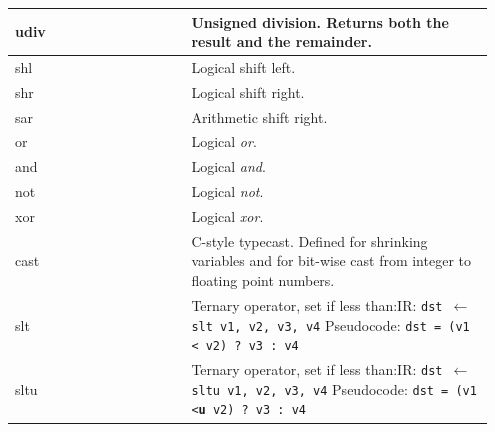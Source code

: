 \documentclass[course=eragp]{aspdoc}
\begin{document}
\begin{center}
\begin{longtable}{p{0.35\linewidth} | p{0.6\linewidth}}
        \hline
        udiv         & \textbf{Unsigned} division. Returns both the result and the remainder.                                                     \\
        \hline
        shl          & Logical shift left.                                                                                                        \\
        \hline
        shr          & Logical shift right.                                                                                                       \\
        \hline
        sar          & Arithmetic shift right.                                                                                                    \\
        \hline
        or           & Logical \textit{or}.                                                                                                       \\
        \hline
        and          & Logical \textit{and}.                                                                                                      \\
        \hline
        not          & Logical \textit{not}.                                                                                                      \\
        \hline
        xor          & Logical \textit{xor}.                                                                                                      \\
        \hline
        cast         & C-style typecast. Defined for shrinking variables and for bit-wise cast from integer to
        floating point numbers.                                                                                                                   \\
        \hline
        slt          & Ternary operator, set if less than:\newline IR: \texttt{dst $\leftarrow$ slt v1, v2, v3, v4} \newline
        Pseudocode: \texttt{dst = (v1 < v2) ? v3 : v4}                                                                                            \\
        \hline
        sltu         & Ternary operator, set if less than:\newline IR: \texttt{dst $\leftarrow$ sltu v1, v2, v3, v4} \newline
        Pseudocode: \texttt{dst = (v1 <\textbf{u} v2) ? v3 : v4}                                                                                  \\

\end{longtable}
\end{center}
\end{document}
